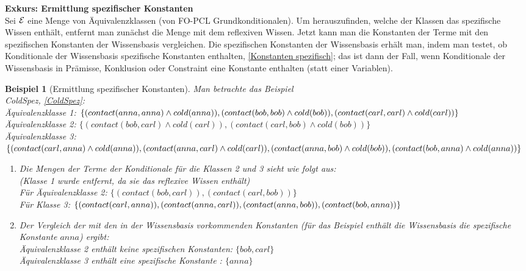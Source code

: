 \documentclass[draft]{scrreprt}
\newtheorem{Bsp}{Beispiel}[section]
\begin{document}
	\textbf{Exkurs: Ermittlung spezifischer Konstanten} \label{Ermittlung spezifischer Konstanten}  \\
Sei $ \cal E $ eine Menge von Äquivalenzklassen (von FO-PCL Grundkonditionalen). Um herauszufinden, welche der Klassen das  spezifische Wissen enthält, entfernt man zunächst die Menge mit dem reflexiven Wissen. Jetzt kann man die Konstanten der Terme mit den spezifischen Konstanten der Wissensbasis vergleichen. Die spezifischen Konstanten der Wissensbasis erhält man, indem man testet, ob Konditionale der Wissensbasis spezifische Konstanten enthalten, \ref{Konstanten spezifisch}; das ist dann der Fall, wenn Konditionale der Wissensbasis in Prämisse, Konklusion oder Constraint eine Konstante enthalten (statt einer Variablen).
\begin{Bsp}[Ermittlung spezifischer Konstanten]
	Man betrachte das Beispiel  \\ ColdSpez, \ref{ColdSpez}:\\ 
	Äquivalenzklasse 1: $ \{(contact(anna,anna) \land cold(anna)), (contact(bob,bob) \land cold(bob)),\\ (contact(carl,carl) \land cold(carl)) \} $\\
	Äquivalenzklasse 2: $ \{(contact(bob,carl) \land cold(carl)), (contact(carl,bob) \land cold(bob)) \} $\\
	Äquivalenzklasse 3: $ \{(contact(carl,anna) \land cold(anna)), (contact(anna, carl) \land cold(carl)),\\ (contact(anna,bob) \land cold(bob)), (contact(bob, anna) \land cold(anna)) \} $\\
	\begin{enumerate}
		\item Die Mengen der Terme der Konditionale für die Klassen 2 und 3 sieht wie folgt aus:\\
		(Klasse 1 wurde entfernt, da sie das reflexive Wissen enthält)\\
		Für Äquivalenzklasse 2: $ \{(contact(bob,carl)), (contact(carl,bob))\}$ \\
		Für Klasse 3: $ \{(contact(carl,anna)), (contact(anna, carl)), (contact(anna,bob)), \\(contact(bob, anna)) \}$ \\
		\item Der Vergleich der mit den in der Wissensbasis vorkommenden Konstanten (für das Beispiel enthält die Wissensbasis die spezifische Konstante $ anna $) ergibt:\\
		Äquivalenzklasse 2 enthält keine spezifischen Konstanten: $ \{bob, carl\}$ \\
		Äquivalenzklasse 3 enthält eine spezifische Konstante : $ \{anna\} $ 
	\end{enumerate}\
\end{Bsp}
\end{document}
